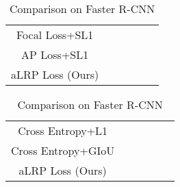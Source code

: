 \documentclass{article}
\begin{document}
\begin{table}[]
\RawFloats
\parbox{.48\linewidth}{
    \centering
    \setlength{\tabcolsep}{0.15em}
    \footnotesize
    \caption{Comparison on FoveaBox \cite{FoveaBox}.}
    \label{tab:anchorfree}
    \begin{tabular}{|c|c|c|c|c|c|} \hline
    &&&&& \\ \hline
    Focal Loss+SL1&&&&&\\ \hline
    AP Loss+SL1&&&&&\\ \hline
    aLRP Loss (Ours)&&&&&\\ \hline
    \end{tabular}
}
\hfill
\parbox{.52\linewidth}{
    \centering
    \setlength{\tabcolsep}{0.15em}
    \footnotesize
    \caption{Comparison on Faster R-CNN \cite{FasterRCNN}}
    \label{tab:twostage}
    \begin{tabular}{|c|c|c|c|c|c|} \hline
    &&&&& \\ \hline
    Cross Entropy+L1&&&&&\\ \hline
    Cross Entropy+GIoU&&&&&\\ \hline
aLRP Loss (Ours)&&&&&\\ \hline
    \end{tabular}
}
\end{table}
\end{document}
